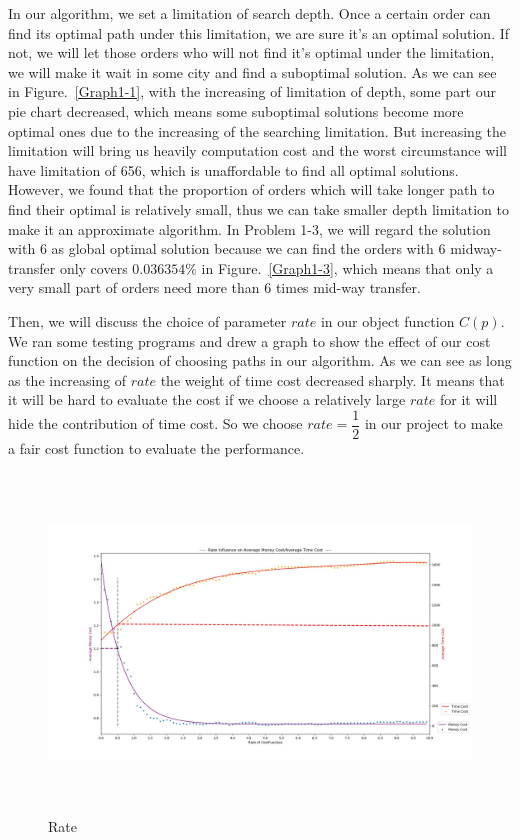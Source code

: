 \documentclass{llncs}
\begin{document}
In our algorithm, we set a limitation of search depth. Once a certain order can find its optimal path under this limitation, we are sure it's an optimal solution. If not, we will let those 
orders who will not find it's optimal under the limitation, we will make it wait in some city and find a suboptimal solution.
As we can see in Figure.~\ref{Graph1-1}, with the increasing of limitation of depth, some part our pie chart decreased, which means some suboptimal solutions become more optimal ones due to the increasing 
of the searching limitation. But increasing the limitation will bring us heavily computation cost and the worst circumstance will have limitation of 656, which is unaffordable to find all optimal solutions.
However, we found that the proportion of orders which will take longer path to find their optimal is relatively small, thus we can take smaller depth limitation to make it an approximate algorithm. In Problem 1-3, we will regard the solution with 6 as global optimal solution because we can find the orders with 6 midway-transfer only covers $0.036354\%$ in Figure.~\ref{Graph1-3}, which means that only a very small part of orders need more than 6 times mid-way transfer. \par


Then, we will discuss the choice of parameter $rate$ in our object function $C(p)$. We ran some testing programs and drew a graph to show the effect of our cost function on the decision of choosing paths in our algorithm.
As we can see as long as the increasing of $rate$ the weight of time cost decreased sharply. It means that it will be hard to evaluate the cost if we choose a relatively large $rate$ for it will hide the contribution of time cost.
So we choose $rate=\dfrac{1}{2}$ in our project to make a fair cost function to evaluate the performance.

\begin{figure}[htbp]
  \centering
  \includegraphics[height = 9cm]{graph/Rate.jpg}
  \caption{Rate}
  \label{fig:rt}
\end{figure}
\end{document}
